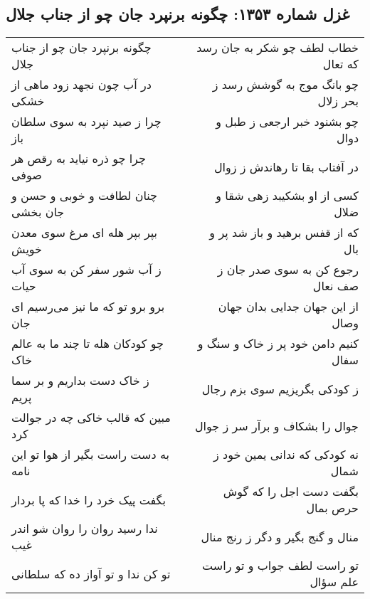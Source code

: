 \begin{center}
\section*{غزل شماره ۱۳۵۳: چگونه برنپرد جان چو از جناب جلال}
\label{sec:1353}
\begin{longtable}{l p{0.5cm} r}
چگونه برنپرد جان چو از جناب جلال
&&
خطاب لطف چو شکر به جان رسد که تعال
\\
در آب چون نجهد زود ماهی از خشکی
&&
چو بانگ موج به گوشش رسد ز بحر زلال
\\
چرا ز صید نپرد به سوی سلطان باز
&&
چو بشنود خبر ارجعی ز طبل و دوال
\\
چرا چو ذره نیاید به رقص هر صوفی
&&
در آفتاب بقا تا رهاندش ز زوال
\\
چنان لطافت و خوبی و حسن و جان بخشی
&&
کسی از او بشکیبد زهی شقا و ضلال
\\
بپر بپر هله ای مرغ سوی معدن خویش
&&
که از قفس برهید و باز شد پر و بال
\\
ز آب شور سفر کن به سوی آب حیات
&&
رجوع کن به سوی صدر جان ز صف نعال
\\
برو برو تو که ما نیز می‌رسیم ای جان
&&
از این جهان جدایی بدان جهان وصال
\\
چو کودکان هله تا چند ما به عالم خاک
&&
کنیم دامن خود پر ز خاک و سنگ و سفال
\\
ز خاک دست بداریم و بر سما پریم
&&
ز کودکی بگریزیم سوی بزم رجال
\\
مبین که قالب خاکی چه در جوالت کرد
&&
جوال را بشکاف و برآر سر ز جوال
\\
به دست راست بگیر از هوا تو این نامه
&&
نه کودکی که ندانی یمین خود ز شمال
\\
بگفت پیک خرد را خدا که پا بردار
&&
بگفت دست اجل را که گوش حرص بمال
\\
ندا رسید روان را روان شو اندر غیب
&&
منال و گنج بگیر و دگر ز رنج منال
\\
تو کن ندا و تو آواز ده که سلطانی
&&
تو راست لطف جواب و تو راست علم سؤال
\\
\end{longtable}
\end{center}

